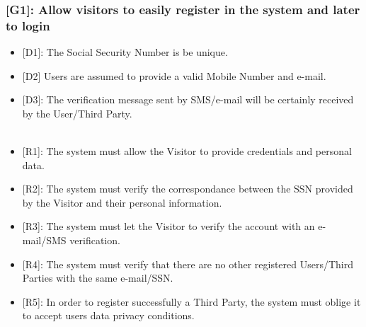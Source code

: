 \documentclass[12pt,a4paper]{article}
\begin{document}
	\subsubsection*{{[}{G1}{]}: Allow visitors to easily register in the system and later to login}
	\begin{itemize}
		\begin{itemize}
			\item {[D1]}: The Social Security Number is be unique.
			\item {[D2]} Users are assumed to provide a valid Mobile Number and e-mail.
			\item {[D3]}: The verification message sent by SMS/e-mail will be certainly received by the User/Third Party.
			\\\\
			\item {[R1]}: The system must allow the Visitor to provide credentials and personal data.
			\item {[R2]}: The system must verify the correspondance between the SSN provided by the Visitor and their personal information.
			\item {[R3]}: The system must let the Visitor to verify the account with an e-mail/SMS verification.
			\item {[R4]}: The system must verify that there are no other registered Users/Third Parties with the same e-mail/SSN.
			\item {[R5]}: In order to register successfully a Third Party, the system must oblige it to accept users data privacy conditions.
		\end{itemize}
	\end{itemize}
\end{document}

